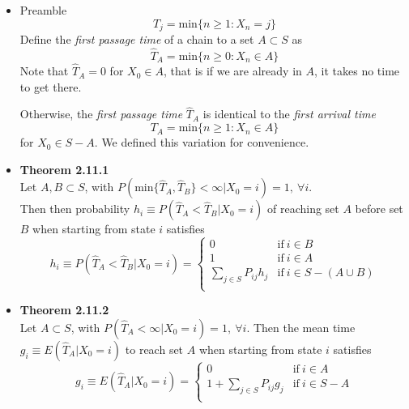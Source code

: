 \documentclass[11pt,a4paper]{article}
\begin{document}
\begin{itemize}

    \item Preamble \\
        \[
            T_j = \text{min}\{n \geq 1 : X_n = j\}
        \]
        Define the \emph{first passage time} of a chain to a set $A \subset S$ as
        \[
            \widehat{T}_A = \text{min} \{n \geq 0 : X_n \in A \}
        \]
        Note that $\widehat{T}_A = 0$ for $X_0 \in A$,
        that is if we are already in $A$, it takes no time to get there.

        Otherwise, the \emph{first passage time} $\widehat{T}_A$ is identical to the
        \emph{first arrival time}
        \[
            T_A = \text{min} \{n \geq 1 : X_n \in A\}
        \]
        for $X_0 \in S - A$.
        We defined this variation for convenience.

    \item \textbf{Theorem 2.11.1} \\
        Let $A, B \subset S$, with
        $P(\text{min}\{\widehat{T}_A,\widehat{T}_B\} < \infty | X_0 = i) = 1, \ \forall i$. \\
        Then then probability
        $h_i \equiv P(\widehat{T}_A < \widehat{T}_B | X_0 = i)$
        of reaching set $A$ before set $B$ when starting from state $i$ satisfies
        \[
            h_i \equiv P(\widehat{T}_A < \widehat{T}_B | X_0 = i) =
            \begin{cases}{}
                0 & \text{if} \ i \in B \\
                1 & \text{if} \ i \in A \\
                \sum_{j \in S} P_{ij}h_j & \text{if} \ i \in S - (A \cup B) \\
            \end{cases}
        \]

    \item \textbf{Theorem 2.11.2} \\
        Let $A \subset S$, with $P(\widehat{T}_A < \infty | X_0 = i) = 1, \ \forall i$.
        Then the mean time $g_i \equiv E(\widehat{T}_A | X_0 = i)$
        to reach set $A$ when starting from state $i$ satisfies
        \[
            g_i \equiv E(\widehat{T}_A | X_0 = i) =
            \begin{cases}{}
                0 & \text{if} \ i \in A \\
                1 + \sum_{j \in S} P_{ij}g_j & \text{if} \ i \in S - A \\
            \end{cases}
        \]

\end{itemize}
\end{document}
